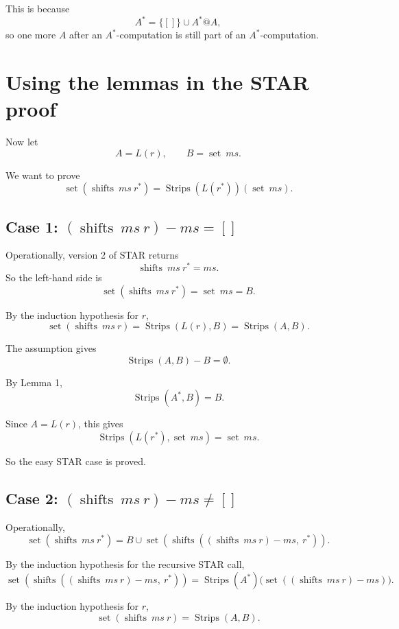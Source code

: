 \documentclass[11pt]{article}
\begin{document}
This is because
\[
A^*=\{[]\}\cup A^*@A,
\]
so one more \(A\) after an \(A^*\)-computation is still part of an \(A^*\)-computation.

\section*{Using the lemmas in the STAR proof}

Now let
\[
A=L(r), \qquad B=\operatorname{set}\ ms.
\]

We want to prove
\[
\operatorname{set}(\operatorname{shifts}\ ms\ r^*)=\operatorname{Strips}(L(r^*))(\operatorname{set}\ ms).
\]

\subsection*{Case 1: \((\operatorname{shifts}\ ms\ r)-ms=[]\)}

Operationally, version 2 of STAR returns
\[
\operatorname{shifts}\ ms\ r^* = ms.
\]
So the left-hand side is
\[
\operatorname{set}(\operatorname{shifts}\ ms\ r^*)=\operatorname{set}\ ms = B.
\]

By the induction hypothesis for \(r\),
\[
\operatorname{set}(\operatorname{shifts}\ ms\ r)=\operatorname{Strips}(L(r),B)=\operatorname{Strips}(A,B).
\]

The assumption gives
\[
\operatorname{Strips}(A,B)-B=\emptyset.
\]

By Lemma 1,
\[
\operatorname{Strips}(A^*,B)=B.
\]

Since \(A=L(r)\), this gives
\[
\operatorname{Strips}(L(r^*),\operatorname{set}\ ms)=\operatorname{set}\ ms.
\]

So the easy STAR case is proved.

\subsection*{Case 2: \((\operatorname{shifts}\ ms\ r)-ms\neq[]\)}

Operationally,
\[
\operatorname{set}(\operatorname{shifts}\ ms\ r^*)
=
B \cup \operatorname{set}(\operatorname{shifts}((\operatorname{shifts}\ ms\ r)-ms,\ r^*)).
\]

By the induction hypothesis for the recursive STAR call,
\[
\operatorname{set}(\operatorname{shifts}((\operatorname{shifts}\ ms\ r)-ms,\ r^*))
=
\operatorname{Strips}(A^*)\bigl(\operatorname{set}((\operatorname{shifts}\ ms\ r)-ms)\bigr).
\]

By the induction hypothesis for \(r\),
\[
\operatorname{set}(\operatorname{shifts}\ ms\ r)=\operatorname{Strips}(A,B).
\]
\end{document}
